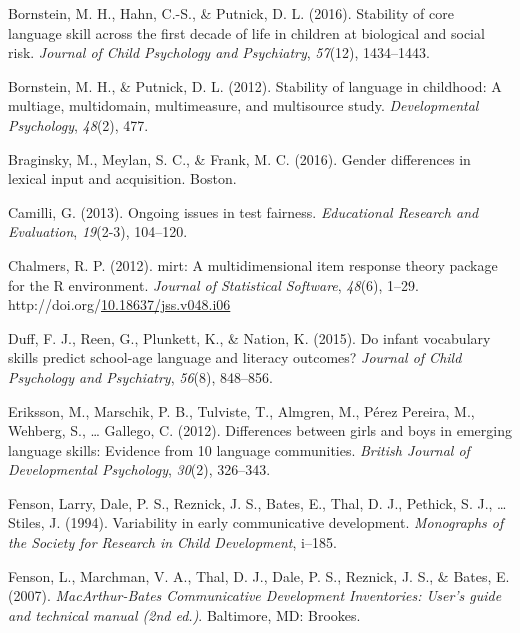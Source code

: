 \documentclass[10pt, letterpaper]{article}
\newenvironment{CSLReferences}%
  {}%
  {\par}
\begin{document}
\hypertarget{refs}{}
\begin{CSLReferences}{1}{0}
\leavevmode\hypertarget{ref-bornstein2016stability}{}%
Bornstein, M. H., Hahn, C.-S., \& Putnick, D. L. (2016). Stability of
core language skill across the first decade of life in children at
biological and social risk. \emph{Journal of Child Psychology and
Psychiatry}, \emph{57}(12), 1434--1443.

\leavevmode\hypertarget{ref-bornstein2012stability}{}%
Bornstein, M. H., \& Putnick, D. L. (2012). Stability of language in
childhood: A multiage, multidomain, multimeasure, and multisource study.
\emph{Developmental Psychology}, \emph{48}(2), 477.

\leavevmode\hypertarget{ref-braginsky2016gender}{}%
Braginsky, M., Meylan, S. C., \& Frank, M. C. (2016). Gender differences
in lexical input and acquisition. Boston.

\leavevmode\hypertarget{ref-camilli2013ongoing}{}%
Camilli, G. (2013). Ongoing issues in test fairness. \emph{Educational
Research and Evaluation}, \emph{19}(2-3), 104--120.

\leavevmode\hypertarget{ref-R-mirt}{}%
Chalmers, R. P. (2012). {mirt}: A multidimensional item response theory
package for the {R} environment. \emph{Journal of Statistical Software},
\emph{48}(6), 1--29.
http://doi.org/\href{https://doi.org/10.18637/jss.v048.i06}{10.18637/jss.v048.i06}

\leavevmode\hypertarget{ref-duff2015infant}{}%
Duff, F. J., Reen, G., Plunkett, K., \& Nation, K. (2015). Do infant
vocabulary skills predict school-age language and literacy outcomes?
\emph{Journal of Child Psychology and Psychiatry}, \emph{56}(8),
848--856.

\leavevmode\hypertarget{ref-eriksson2012differences}{}%
Eriksson, M., Marschik, P. B., Tulviste, T., Almgren, M., Pérez Pereira,
M., Wehberg, S., \ldots{} Gallego, C. (2012). Differences between girls
and boys in emerging language skills: Evidence from 10 language
communities. \emph{British Journal of Developmental Psychology},
\emph{30}(2), 326--343.

\leavevmode\hypertarget{ref-fenson1994}{}%
Fenson, Larry, Dale, P. S., Reznick, J. S., Bates, E., Thal, D. J.,
Pethick, S. J., \ldots{} Stiles, J. (1994). Variability in early
communicative development. \emph{Monographs of the Society for Research
in Child Development}, i--185.

\leavevmode\hypertarget{ref-Fenson2007}{}%
Fenson, L., Marchman, V. A., Thal, D. J., Dale, P. S., Reznick, J. S.,
\& Bates, E. (2007). \emph{{M}ac{A}rthur-{B}ates {C}ommunicative
{D}evelopment {I}nventories: User's guide and technical manual (2nd
ed.)}. Baltimore, MD: Brookes.


\end{CSLReferences}
\end{document}
